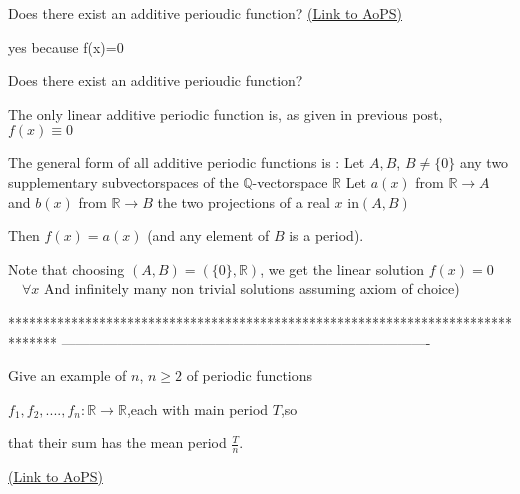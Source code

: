 \begin{problem}
	Does there exist an additive perioudic function?
	\flushright \href{https://artofproblemsolving.com/community/c6h1590479}{(Link to AoPS)}
\end{problem}



\begin{solution}
	yes because f(x)=0
\end{solution}



\begin{solution}
	\begin{tcolorbox}Does there exist an additive perioudic function?\end{tcolorbox}
The only linear additive periodic function is, as given in previous post, $f(x)\equiv 0$

The general form of all additive periodic functions is :
Let $A,B$, $B\ne\{0\}$ any two supplementary subvectorspaces of the $\mathbb Q$-vectorspace $\mathbb R$
Let $a(x)$ from $\mathbb R\to A$ and $b(x)$ from $\mathbb R\to B$ the two projections of a real $x$ in$(A,B)$

Then $f(x)=a(x)$
(and any element of $B$ is a period).

Note that choosing $(A,B)=(\{0\},\mathbb R)$, we get the linear solution $f(x)=0$ $\quad\forall x$
And infinitely many non trivial solutions assuming axiom of choice)


\end{solution}
*******************************************************************************
-------------------------------------------------------------------------------

\begin{problem}
	Give an example of $n$, $n\geq2$ of periodic functions

$f_{1},f_{2},....,f_{n}:\mathbb{R}$$\rightarrow\mathbb{R}$,each
with main period $T$,so 

that their sum has the mean period $\frac{T}{n}.$

	\flushright \href{https://artofproblemsolving.com/community/c6h1590489}{(Link to AoPS)}
\end{problem}



